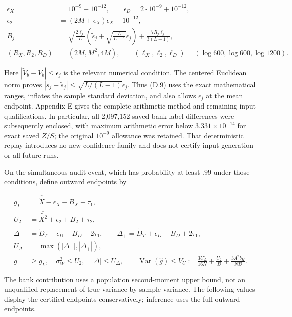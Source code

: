 \documentclass{article}
\begin{document}
\[
\begin{aligned}
\epsilon_X&=10^{-9}+10^{-12},\qquad
\epsilon_D=2\cdot10^{-9}+10^{-12},\\
\epsilon_2&=(2M+\epsilon_X)\epsilon_X+10^{-12},\\
B_j&=\sqrt{\frac{2\ell_j}{L}}\!
 \left(\widetilde s_j+\sqrt{\frac{L}{L-1}}\epsilon_j\right)
 +\frac{7R_j\ell_j}{3(L-1)},\\
(R_X,R_2,R_D)&=(2M,M^2,4M),\qquad
(\ell_X,\ell_2,\ell_D)=(\log600,\log600,\log1200).
\end{aligned}
\tag{D.9}
\]

Here \(|\widetilde V_b-V_b|\le\epsilon_j\) is the relevant numerical
condition. The centered Euclidean norm proves
\(|s_j-\widetilde s_j|\le\sqrt{L/(L-1)}\epsilon_j\). Thus (D.9) uses the
exact mathematical ranges, inflates the sample standard deviation, and
also allows \(\epsilon_j\) at the mean endpoint. Appendix E gives the
complete arithmetic method and remaining input qualifications. In
particular, all 2,097,152 saved bank-label differences were subsequently
enclosed, with maximum arithmetic error below \(3.331\times10^{-14}\)
for exact saved \(Z/S\); the original \(10^{-9}\) allowance was
retained. That deterministic replay introduces no new confidence family
and does not certify input generation or all future runs.

On the simultaneous audit event, which has probability at least \(.99\)
under those conditions, define outward endpoints by

\[
\begin{aligned}
g_L&=\overline{\widetilde X}-\epsilon_X-B_X-\tau_1,\\
U_2&=\overline{\widetilde{X^2}}+\epsilon_2+B_2+\tau_2,\\
\Delta_-&=\overline{\widetilde D_T}-\epsilon_D-B_D-2\tau_1,\qquad
\Delta_+=\overline{\widetilde D_T}+\epsilon_D+B_D+2\tau_1,\\
U_\Delta&=\max(|\Delta_-|,|\Delta_+|),\\
g&\ge g_L,\quad \sigma_W^2\le U_2,\quad |\Delta|\le U_\Delta,\qquad
\operatorname{Var}(\widehat g)\le V_U:=
\frac{3U_\Delta^2}{16N}+\frac{U_2}{B}+\frac{3A^2b_K}{NB}.
\end{aligned}
\tag{D.10}
\]

The bank contribution uses a population second-moment upper bound, not
an unqualified replacement of true variance by sample variance. The
following values display the certified endpoints conservatively;
inference uses the full outward endpoints.
\end{document}
